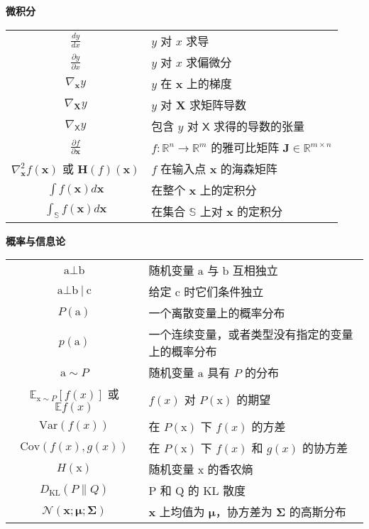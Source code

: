 \begin{center}
  {\Large\bfseries 微积分}\\
  \vspace{1em}
  \begin{tabular}{c l}
    $\frac{dy}{dx}$ & $y$ 对 $x$ 求导 \\
    $\frac{\partial y}{\partial x}$ & $y$ 对 $x$ 求偏微分 \\
    $\nabla_{\pmb{x}}y$ & $y$ 在 $\pmb{x}$ 上的梯度 \\
    $\nabla_{\pmb{X}}y$ & $y$ 对 $\pmb{X}$ 求矩阵导数 \\
    $\nabla_{\pmb{\mathsf{X}}}y$ & 包含 $y$ 对 $\pmb{\mathsf{X}}$ 求得的导数的张量 \\
    $\frac{\partial f}{\partial \pmb{x}}$ & $f : \mathbb{R}^n \rightarrow \mathbb{R}^m$ 的雅可比矩阵 $\pmb{J} \in \mathbb{R}^{m \times n}$ \\
    $\nabla^2_{\pmb{x}}f(\pmb{x})$ 或 $\pmb{H}(f)(\pmb{x})$ & $f$ 在输入点 $\pmb{x}$ 的海森矩阵\\
    $\displaystyle\int f(\pmb{x})d\pmb{x}$ & 在整个 $\pmb{x}$ 上的定积分\\
    $\displaystyle\int_{\mathbb{S}} f(\pmb{x})d\pmb{x}$ & 在集合 $\mathbb{S}$ 上对 $\pmb{x}$ 的定积分 \\
  \end{tabular}
\end{center}

\vspace{1em}

\begin{center}
  {\Large\bfseries 概率与信息论}\\
  \vspace{1em}
  \begin{tabular}{c l}
    $\mathrm{a} \bot \mathrm{b}$ & 随机变量 $\mathrm{a}$ 与 $\mathrm{b}$ 互相独立 \\
    $\mathrm{a} \bot \mathrm{b}\: | \: \mathrm{c}$ & 给定 $\mathrm{c}$ 时它们条件独立 \\
    $P(\mathrm{a})$ & 一个离散变量上的概率分布 \\
    $p(\mathrm{a})$ & 一个连续变量，或者类型没有指定的变量上的概率分布 \\
    $\mathrm{a} \sim P$ & 随机变量 $\mathrm{a}$ 具有 $P$ 的分布 \\
    $\mathbb{E}_{\mathrm{x} \sim P} [f(x)]$ 或 $\mathbb{E}f(x)$ & $f(x)$ 对 $P(\mathrm{x})$ 的期望 \\
    $\mathrm{Var}(f(x))$ & 在 $P(\mathrm{x})$ 下 $f(x)$ 的方差 \\
    $\mathrm{Cov}(f(x),g(x))$ & 在 $P(\mathrm{x})$ 下 $f(x)$ 和 $g(x)$ 的协方差 \\
    $H(\mathrm{x})$ & 随机变量 $\mathrm{x}$ 的香农熵 \\
    $D_{\mathrm{KL}}(P \parallel Q)$ & $\mathrm{P}$ 和 $\mathrm{Q}$ 的 $\mathrm{KL}$ 散度 \\
    $\mathcal{N}(\pmb{x};\pmb{\mu};\pmb{\Sigma})$ & $\pmb{x}$ 上均值为 $\pmb{\mu}$，协方差为 $\pmb{\Sigma}$ 的高斯分布 \\
  \end{tabular}
\end{center}

